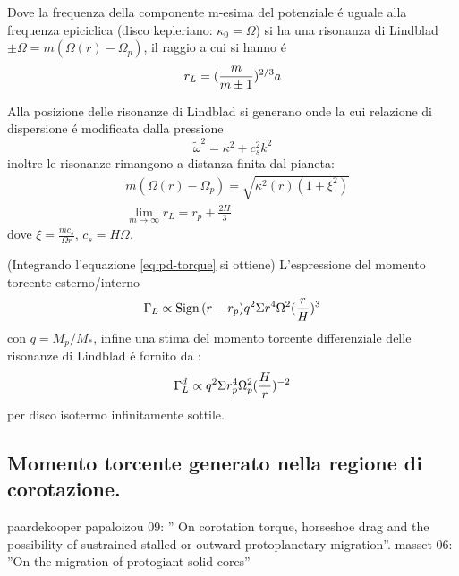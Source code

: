Dove la frequenza della componente m-esima del potenziale \'e uguale alla frequenza epiciclica (disco kepleriano: $\kappa_0=\Omega$) si ha una risonanza di Lindblad $\pm\Omega=m(\Omega(r)-\Omega_p)$, il raggio a cui si hanno \'e
\begin{equation}
r_L=(\frac{m}{m\pm1})^{2/3}a
\end{equation}

Alla posizione delle risonanze di Lindblad si generano onde la cui relazione di dispersione \'e modificata dalla pressione
\begin{equation}
\tilde{\omega}^2=\kappa^2+c_s^2k^2
\end{equation}
inoltre le risonanze rimangono a distanza finita dal pianeta:
\begin{align}
&m(\Omega(r)-\Omega_p)=\sqrt{\kappa^2(r)(1+\xi^2)}\\
&\lim_{m\to\infty}r_L=r_p+\frac{2H}{3}
\end{align}
dove $\xi=\frac{mc_s}{\Omega r}$, $c_s=H\Omega$.


(Integrando l'equazione \eqref{eq:pd-torque} si ottiene) L'espressione del momento torcente esterno/interno
\begin{equation}
\Gamma_L\propto\operatorname{Sign}{(r-r_p)}q^2\Sigma r^4\Omega^2(\frac{r}{H})^3
\end{equation}
con $q=M_p/M_*$, infine una stima del momento torcente differenziale delle risonanze di Lindblad \'e fornito da \cite{tanaka2002three}:
\begin{equation}
\Gamma_L^d\propto q^2\Sigma r_p^4\Omega_p^2(\frac{H}{r})^{-2}
\end{equation}
per disco isotermo infinitamente sottile.

\subsection{Momento torcente generato nella regione di corotazione.}

\begin{workout}
paardekooper papaloizou 09: '' On corotation torque, horseshoe drag and the possibility of sustrained stalled or outward protoplanetary migration''.
masset 06: ''On the migration of protogiant solid cores''
\end{workout}

